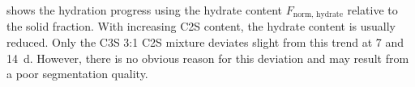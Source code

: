 



 shows the hydration progress using the hydrate content $F_\text{norm, hydrate}$ relative to the solid fraction.
With increasing \ac{C2S} content, the hydrate content is usually reduced.
Only the \ac{C3S} 3:1 \ac{C2S} mixture deviates slight from this trend at \num{7} and \qty{14}{\day}.
However, there is no obvious reason for this deviation and may result from a poor segmentation quality.

